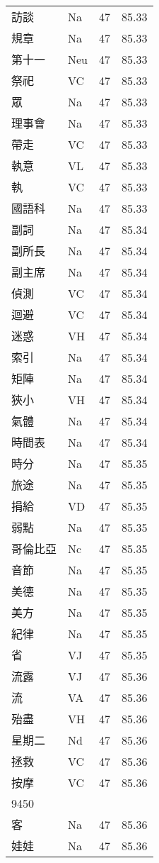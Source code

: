 \documentclass[twocolumn]{book}
\begin{document}
\begin{supertabular}{llrr}
訪談 & Na & 47 &  85.33\\
規章 & Na & 47 &  85.33\\
第十一 & Neu & 47 &  85.33\\
祭祀 & VC & 47 &  85.33\\
眾 & Na & 47 &  85.33\\
理事會 & Na & 47 &  85.33\\
帶走 & VC & 47 &  85.33\\
執意 & VL & 47 &  85.33\\
執 & VC & 47 &  85.33\\
國語科 & Na & 47 &  85.33\\
副詞 & Na & 47 &  85.34\\
副所長 & Na & 47 &  85.34\\
副主席 & Na & 47 &  85.34\\
偵測 & VC & 47 &  85.34\\
迴避 & VC & 47 &  85.34\\
迷惑 & VH & 47 &  85.34\\
索引 & Na & 47 &  85.34\\
矩陣 & Na & 47 &  85.34\\
狹小 & VH & 47 &  85.34\\
氣體 & Na & 47 &  85.34\\
時間表 & Na & 47 &  85.34\\
時分 & Na & 47 &  85.35\\
旅途 & Na & 47 &  85.35\\
捐給 & VD & 47 &  85.35\\
弱點 & Na & 47 &  85.35\\
哥倫比亞 & Nc & 47 &  85.35\\
音節 & Na & 47 &  85.35\\
美德 & Na & 47 &  85.35\\
美方 & Na & 47 &  85.35\\
紀律 & Na & 47 &  85.35\\
省 & VJ & 47 &  85.35\\
流露 & VJ & 47 &  85.36\\
流 & VA & 47 &  85.36\\
殆盡 & VH & 47 &  85.36\\
星期二 & Nd & 47 &  85.36\\
拯救 & VC & 47 &  85.36\\
按摩 & VC & 47 &  85.36\\
9450\\
客 & Na & 47 &  85.36\\
娃娃 & Na & 47 &  85.36\\

\end{supertabular}
\end{document}
